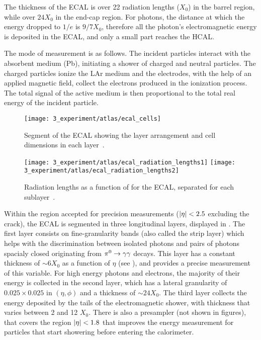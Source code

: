 The thickness of the \ac{ECAL} is over 22 radiation lengths (\(X_0\)) in the barrel region, while over \(24 X_0\) in the end-cap region. For photons, the distance at which the energy dropped to \(1/e\) is \(9/7 X_0\), therefore all the photon's electromagnetic energy is deposited in the \ac{ECAL}, and only a small part reaches the \ac{HCAL}.

The mode of measurement is as follows. The incident particles interact with the absorbent medium (Pb), initiating a shower of charged and neutral particles. The charged particles ionize the \ac{LAr} medium and the electrodes, with the help of an applied magnetic field, collect the electrons produced in the ionization process. The total signal of the active medium is then proportional to the total real energy of the incident particle.

\begin{figure}[ht!]
    \centering
    \texttt{[image: 3\_experiment/atlas/ecal\_cells]}
    \caption{Segment of the \ac{ECAL} showing the layer arrangement and cell dimensions in each layer~\cite{ATLAS}.}
    \label{fig:atlas:atlas:cals:ecal:ecal_cells}
\end{figure}

\begin{figure}[ht!]
    \centering
    \texttt{[image: 3\_experiment/atlas/ecal\_radiation\_lengths1]}
    \texttt{[image: 3\_experiment/atlas/ecal\_radiation\_lengths2]}
    \caption{Radiation lengths as a function of \abseta for the \ac{ECAL}, separated for each sublayer~\cite{ATLAS}.}
    \label{fig:atlas:atlas:cals:ecal:ecal_radiation_length}
\end{figure}

Within the region accepted for precision measurements (\(|\eta|<2.5\) excluding the crack), the \ac{ECAL} is segmented in three longitudinal layers, displayed in \Fig{\ref{fig:atlas:atlas:cals:ecal:ecal_cells}}.
The first layer consists on fine-granularity bands (also called the strip layer) which helps with the discrimination between isolated photons and pairs of photons spacialy closed originating from \(\pi^{0}\rightarrow\gamma\gamma\) decays. This layer has a constant thickness of \(\sim 6 X_0\) as a function of \(\eta\) (see \Fig{\ref{fig:atlas:atlas:cals:ecal:ecal_radiation_length}}), and provides a precise measurement of this variable.
For high energy photons and electrons, the majority of their energy is collected in the second layer, which has a lateral granularity of \(0.025 \times 0.025\) in \((\eta, \phi)\) and a thickness of \(\sim 24 X_0\).
The third layer collects the energy deposited by the tails of the electromagnetic shower, with thickness that varies between 2 and 12 \(X_0\).
There is also a presampler (not shown in figures), that covers the region \(|\eta|<1.8\) that improves the energy measurement for particles that start showering before entering the calorimeter.




